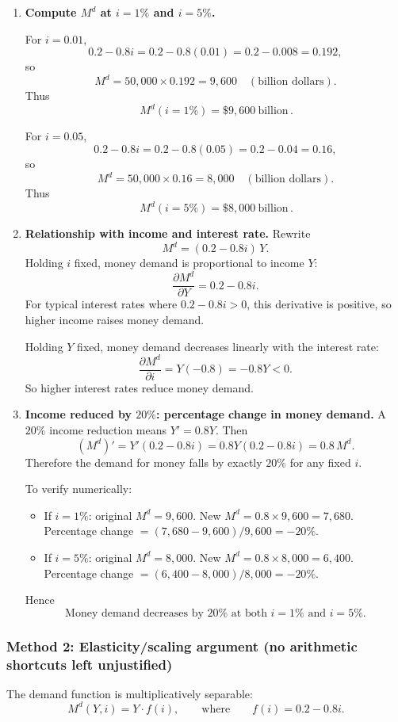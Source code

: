 \documentclass[12pt]{article}
\begin{document}
\begin{enumerate}[label=(\alph*)]
\item \textbf{Compute \(M^d\) at \(i=1\%\) and \(i=5\%\).}

For \(i=0.01\),
\[
0.2-0.8i = 0.2-0.8(0.01)=0.2-0.008=0.192,
\]
so
\[
M^d = 50{,}000\times 0.192 = 9{,}600 \quad (\text{billion dollars}).
\]
Thus
\[
\boxed{\,M^d(i=1\%) = \$9{,}600\ \text{billion}\, }.
\]

For \(i=0.05\),
\[
0.2-0.8i = 0.2-0.8(0.05)=0.2-0.04=0.16,
\]
so
\[
M^d = 50{,}000\times 0.16 = 8{,}000 \quad (\text{billion dollars}).
\]
Thus
\[
\boxed{\,M^d(i=5\%) = \$8{,}000\ \text{billion}\, }.
\]

\item \textbf{Relationship with income and interest rate.}
Rewrite
\[
M^d = (0.2-0.8i)\,Y.
\]
Holding \(i\) fixed, money demand is proportional to income \(Y\):
\[
\frac{\partial M^d}{\partial Y} = 0.2-0.8i.
\]
For typical interest rates where \(0.2-0.8i>0\), this derivative is positive, so higher income raises money demand.

Holding \(Y\) fixed, money demand decreases linearly with the interest rate:
\[
\frac{\partial M^d}{\partial i} = Y(-0.8) = -0.8Y < 0.
\]
So higher interest rates reduce money demand.

\item \textbf{Income reduced by \(20\%\): percentage change in money demand.}
A \(20\%\) income reduction means \(Y' = 0.8Y\). Then
\[
(M^d)' = Y'(0.2-0.8i) = 0.8Y(0.2-0.8i)=0.8\,M^d.
\]
Therefore the demand for money falls by exactly \(20\%\) for any fixed \(i\).

To verify numerically:
\begin{itemize}[leftmargin=*]
  \item If \(i=1\%\): original \(M^d=9{,}600\). New \(M^d=0.8\times 9{,}600=7{,}680\). Percentage change \(=(7{,}680-9{,}600)/9{,}600=-20\%\).
  \item If \(i=5\%\): original \(M^d=8{,}000\). New \(M^d=0.8\times 8{,}000=6{,}400\). Percentage change \(=(6{,}400-8{,}000)/8{,}000=-20\%\).
\end{itemize}
Hence
\[
\boxed{\,\text{Money demand decreases by }20\%\text{ at both }i=1\%\text{ and }i=5\%.\,}
\]
\end{enumerate}

\subsubsection*{Method 2: Elasticity/scaling argument (no arithmetic shortcuts left unjustified)}
The demand function is multiplicatively separable:
\[
M^d(Y,i)=Y\cdot f(i),
\qquad\text{where}\qquad
f(i)=0.2-0.8i.
\]
\end{document}
